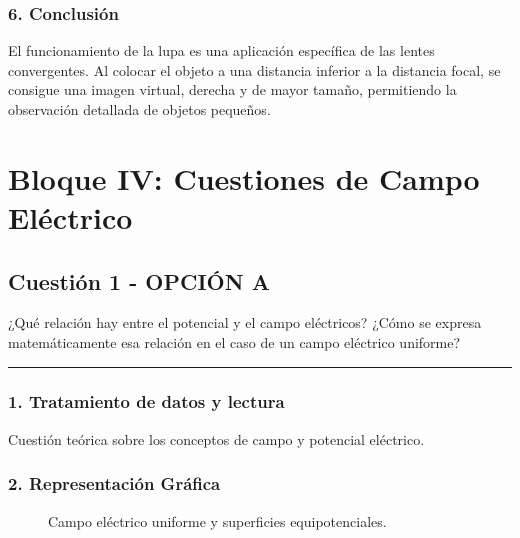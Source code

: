 \subsubsection*{6. Conclusión}
\begin{cajaconclusion}
El funcionamiento de la lupa es una aplicación específica de las lentes convergentes. Al colocar el objeto a una distancia inferior a la distancia focal, se consigue una imagen virtual, derecha y de mayor tamaño, permitiendo la observación detallada de objetos pequeños.
\end{cajaconclusion}

\newpage

\section{Bloque IV: Cuestiones de Campo Eléctrico}
\label{sec:elec_2006_jun_ord}

\subsection{Cuestión 1 - OPCIÓN A}
\label{subsec:4A_2006_jun_ord}

\begin{cajaenunciado}
¿Qué relación hay entre el potencial y el campo eléctricos? ¿Cómo se expresa matemáticamente esa relación en el caso de un campo eléctrico uniforme?
\end{cajaenunciado}
\hrule

\subsubsection*{1. Tratamiento de datos y lectura}
Cuestión teórica sobre los conceptos de campo y potencial eléctrico.

\subsubsection*{2. Representación Gráfica}
\begin{figure}[H]
    \centering
    \caption{Campo eléctrico uniforme y superficies equipotenciales.}
\end{figure}

